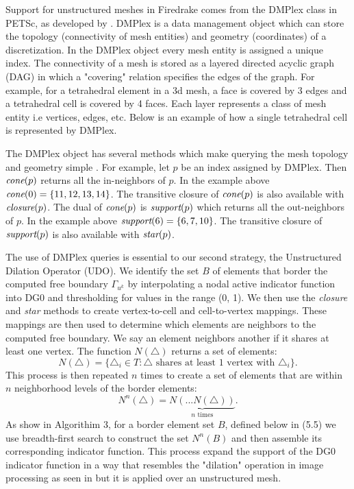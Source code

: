 \documentclass[]{interact}
\theoremstyle{plain}%
\theoremstyle{definition}
\theoremstyle{remark}
\begin{document}
Support for unstructured meshes in Firedrake comes from the DMPlex class in PETSc, as developed by \cite{LangeKnepleyGorman2015}. DMPlex is a data management object which can store the topology (connectivity of mesh entities) and geometry (coordinates) of a discretization. In the DMPlex object every mesh entity is assigned a unique index. The connectivity of a mesh is stored as a layered directed acyclic graph (DAG) in which a "covering" relation specifies the edges of the graph. For example, for a tetrahedral element in a 3d mesh, a face is covered by 3 edges and a tetrahedral cell is covered by 4 faces. Each layer represents a class of mesh entity i.e vertices, edges, etc. Below is an example of how a single tetrahedral cell is represented by DMPlex.

The DMPlex object has several methods which make querying the mesh topology and geometry simple \citep{Langeetal2016}. For example, let $p$ be an index assigned by DMPlex. Then $\emph{cone}(p)$ returns all the in-neighbors of $p$. In the example above $\emph{cone}(0) = \{11, 12, 13, 14\}$. The transitive closure of $\emph{cone}(p)$ is also available with $\emph{closure}(p)$. The dual of $\emph{cone}(p)$ is $\emph{support}(p)$ which returns all the out-neighbors of $p$. In the example above $\emph{support}(6) = \{6, 7, 10\}$. The transitive closure of $\emph{support}(p)$ is also available with $\emph{star}(p)$. 

The use of DMPlex queries is essential to our second strategy, the Unstructured Dilation Operator (UDO). We identify the set $B$ of elements that border the computed free boundary $\Gamma_{u^k}$ by interpolating a nodal active indicator function into DG0 and thresholding for values in the range (0, 1). We then use the \emph{closure} and \emph{star} methods to create vertex-to-cell and cell-to-vertex mappings. These mappings are then used to determine which elements are neighbors to the computed free boundary. We say an element neighbors another if it shares at least one vertex. The function $N(\triangle)$ returns a set of elements:
\begin{equation}
  N(\triangle) = \{\triangle_i \in T: \triangle \text{ shares at least 1 vertex with } \triangle_i\}.
\end{equation}
This process is then repeated $n$ times to create a set of elements that are within $n$ neighborhood levels of the border elements:
\begin{equation}
  N^n(\triangle) = \underbrace{N(...N(\triangle))}_{n \text{ times}}.
\end{equation}
As show in Algorithim 3, for a border element set $B$, defined below in (5.5) we use breadth-first search to construct the set $N^n(B)$ and then assemble its corresponding indicator function. This process expand the support of the DG0 indicator function in a way that resembles the "dilation" operation in image processing as seen in \citep{OpenCV} but it is applied over an unstructured mesh.
\end{document}
